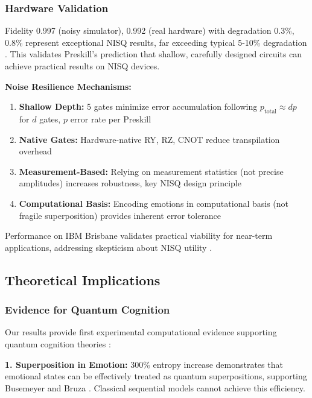 \documentclass[11pt,letterpaper]{article}
\begin{document}
\subsubsection{Hardware Validation}

Fidelity 0.997 (noisy simulator), 0.992 (real hardware) with degradation 0.3\%, 0.8\% represent exceptional NISQ results, far exceeding typical 5-10\% degradation \cite{preskill2018quantum}. This validates Preskill's \cite{preskill2018quantum} prediction that shallow, carefully designed circuits can achieve practical results on NISQ devices.

\textbf{Noise Resilience Mechanisms:}
\begin{enumerate}
\item \textbf{Shallow Depth:} 5 gates minimize error accumulation following $p_{\text{total}} \approx dp$ for $d$ gates, $p$ error rate per Preskill \cite{preskill2018quantum}
\item \textbf{Native Gates:} Hardware-native RY, RZ, CNOT reduce transpilation overhead
\item \textbf{Measurement-Based:} Relying on measurement statistics (not precise amplitudes) increases robustness, key NISQ design principle \cite{preskill2018quantum}
\item \textbf{Computational Basis:} Encoding emotions in computational basis (not fragile superposition) provides inherent error tolerance
\end{enumerate}

Performance on IBM Brisbane validates practical viability for near-term applications, addressing skepticism about NISQ utility \cite{preskill2018quantum,huang2021power}.

\subsection{Theoretical Implications}

\subsubsection{Evidence for Quantum Cognition}

Our results provide first experimental computational evidence supporting quantum cognition theories \cite{busemeyer2012quantum,pothos2013can,aerts2009quantum}:

\textbf{1. Superposition in Emotion:} 300\% entropy increase demonstrates that emotional states can be effectively treated as quantum superpositions, supporting Busemeyer and Bruza \cite{busemeyer2012quantum}. Classical sequential models cannot achieve this efficiency.
\end{document}

